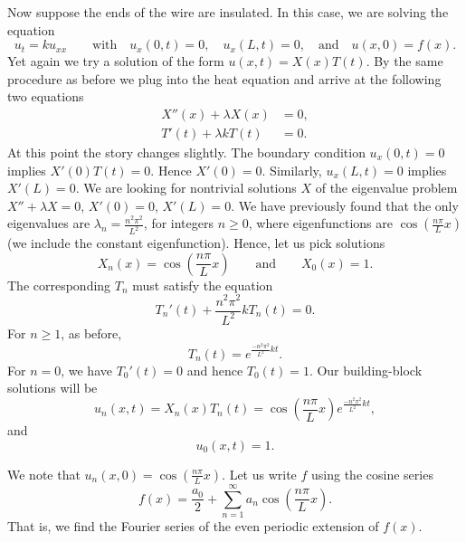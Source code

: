 Now suppose the ends of the wire are insulated.  In this case, we are solving
the equation
\begin{equation*}
u_t = k u_{xx}
\qquad \text{with} \quad
u_x(0,t) = 0, \quad u_x(L,t) = 0,
\quad \text{and} \quad u(x,0) = f(x) .
\end{equation*}
Yet again we try a solution of the form $u(x,t) = X(x)T(t)$.  By the same
procedure as before we plug into the heat equation and arrive at the
following
two equations
\begin{align*}
X''(x) + \lambda X(x) &= 0 , \\
T'(t) + \lambda k T(t) &= 0 .
\end{align*}
At this point the story changes slightly.
The boundary condition $u_x(0,t) = 0$ implies $X'(0)T(t) = 0$.
Hence $X'(0) = 0$.  Similarly, $u_x(L,t) = 0$ implies $X'(L) = 0$.  We
are looking for nontrivial solutions $X$ of the eigenvalue problem
$X'' + \lambda X = 0$, $X'(0) = 0$, $X'(L) = 0$.  We have previously found that
the only eigenvalues are $\lambda_n = \frac{n^2 \pi^2}{L^2}$, for integers
$n \geq 0$,
where eigenfunctions are $\cos \left( \frac{n \pi}{L} x\right)$
(we include the constant
eigenfunction).  Hence, let us pick
solutions
\begin{equation*}
X_n (x) = \cos \left( \frac{n \pi}{L} x \right)
\qquad \text{and} \qquad
X_0 (x) = 1.
\end{equation*}
The corresponding $T_n$ must satisfy the equation
\begin{equation*}
T_n'(t) + \frac{n^2 \pi^2}{L^2} k T_n(t) = 0 .
\end{equation*}
For $n \geq 1$, as before,
\begin{equation*}
T_n(t) = e^{\frac{-n^2 \pi^2}{L^2} k t} .
\end{equation*}
For $n = 0$, we have $T_0'(t) = 0$ and hence $T_0(t) = 1$.
Our building-block solutions will be
\begin{equation*}
u_n(x,t) = X_n(x)T_n(t) =
\cos \left( \frac{n \pi}{L} x \right)
e^{\frac{-n^2 \pi^2}{L^2} k t} ,
\end{equation*}
and
\begin{equation*}
u_0(x,t) = 1 .
\end{equation*}

We note that $u_n(x,0) = \cos \left( \frac{n \pi}{L} x \right)$.  Let us
write $f$ using the cosine series
\begin{equation*}
f(x) = \frac{a_0}{2} + \sum_{n=1}^\infty a_n \cos \left( \frac{n \pi}{L} x
\right) .
\end{equation*}
That is, we find the Fourier series of the even periodic extension of $f(x)$.

